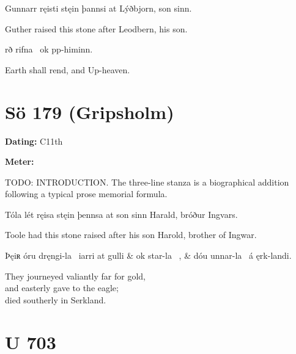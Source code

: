 \sectionline

\bpg\bpa[0]Gunnarr ręisti stęin þannsi at Lýðbjorn, son sinn.\epa

\bpb Guther raised this stone after Leodbern, his son.\epb\epg


\bvg\bva[]%
rð  rifna \hld\ ok pp-himinn.\eva

\bvb Earth shall rend, and Up-heaven.\evb\evg

\sectionline

\section{Sö 179 (Gripsholm)}

\begin{flushright}%
\textbf{Dating:} C11th

\textbf{Meter:} \Fornyrdislag
\end{flushright}%

TODO: INTRODUCTION.  The three-line stanza is a biographical addition following a typical prose memorial formula.

\sectionline

\bpg\bpa[0]Tóla lét ręisa stęin þennsa at son sinn Harald, bróður Ingvars.\epa

\bpb Toole had this stone raised after his son Harold, brother of Ingwar.\epb\epg

\bvg\bva[]%
Þęiʀ óru dręngi-la \hld\ iarri at gulli &
ok star-la \hld\ , &
dóu unnar-la \hld\ á ęrk-landi.\eva

\bvb They journeyed valiantly far for gold, \\
and easterly gave to the eagle; \\
died southerly in Serkland.\evb\evg

\sectionline

\section{U 703}

